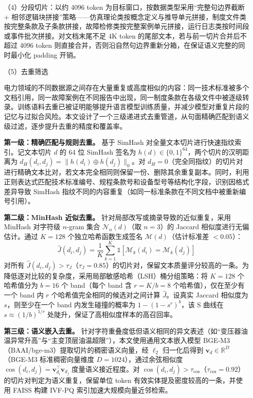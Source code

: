 \documentclass[fontset=fandol,type=master,campus=shenzhen,etitleauto=true]{hithesisbook}
\begin{document}
\noindent （4）分段切片：以约 4096 token 为目标窗口，按数据类型采用``完整句边界截断 + 相邻逻辑块拼接''策略——仿真理论类按概念定义与推导单元拼接，制度文件类按完整条款及子条款拼接，故障检修类按完整案例单元拼接，运行日志类按时间段或事件批次拼接。对文档末尾不足 4K token 的尾部文本，若与前一切片合并后不超过 4096 token 则直接合并，否则沿自然句边界重新分箱，在保证语义完整的同时最小化 padding 开销。

\noindent （5）去重筛选

电力领域的不同数据源之间存在大量重复或高度相似的内容：同一技术标准被多个文档引用，同一故障案例在不同报告中出现，同一制度条款在各级文件中被逐级转录。训练语料去重已被证明能够提升语言模型训练质量，并减少模型对重复片段的记忆与过拟合风险\cite{ref57}。本文设计了一个三级递进式去重管道，从句面精确匹配到语义级过滤，逐步提升去重的精度和覆盖率。

\textbf{第一级：精确匹配与规则去重。} 基于 SimHash 对全量文本切片进行快速指纹索引\cite{ref59,ref60}。记文本切片 $d$ 的 64 位 SimHash 签名为 $h(d) \in \{0,1\}^{64}$，两个切片的汉明距离为 $d_H(d_i, d_j) = \|h(d_i) \oplus h(d_j)\|_0$。对 $d_H = 0$（完全同指纹）的切片对进行精确文本比对，若文本完全相同则保留一份、删除其余重复副本。同时，利用正则表达式匹配技术标准编号、规程条款号和设备型号等结构化字段，识别因格式差异导致 SimHash 指纹不同的内容重复（如同一标准条款在不同文档中被重新编号引用）。

\textbf{第二级：MinHash 近似去重。} 针对局部改写或摘录导致的近似重复，采用 MinHash 对字符级 $n$-gram 集合 $\mathcal{N}_n(d)$（取 $n = 3$）的 Jaccard 相似度进行无偏估计\cite{ref61}。通过 $K = 128$ 个独立哈希函数生成签名 $\mathcal{M}(d)$（估计标准差 $< 0.05$）：
\begin{equation}
\hat{J}(d_i, d_j) = \frac{1}{K} \sum_{k=1}^{K} \mathbb{1}\left[\mathcal{M}_k(d_i) = \mathcal{M}_k(d_j)\right]
\end{equation}
对所有 $\hat{J}(d_i, d_j) > \tau_J$（$\tau_J = 0.85$）的切片对，保留文本质量评分较高的一条。为降低逐对比较的复杂度，采用局部敏感哈希（LSH）桶分组策略\cite{ref62}：将 $K=128$ 个哈希值分为 $b=16$ 个 band（每个 band 含 $r = K/b = 8$ 个哈希值），仅在至少有一个 band 内 $r$ 个哈希值完全相同的候选对之间计算 $\hat{J}$。设真实 Jaccard 相似度为 $s$，则至少在一个 band 内发生碰撞的概率为 $1 - (1 - s^r)^b$，该 S 曲线在 $s \approx (1/b)^{1/r}$ 处陡升，保证了高相似度样本的高召回率。

\textbf{第三级：语义嵌入去重。} 针对字符重叠度低但语义相同的异文表述（如``变压器油温异常升高''与``主变顶层油温超限''），本文使用通用文本嵌入模型 BGE-M3（BAAI/bge-m3）提取切片的稠密语义向量，经 $\ell_2$ 归一化后得到 $\mathbf{v}_d \in \mathbb{R}^{D}$（BGE-M3 标准稠密向量维度 $D = 1024$），通过余弦相似度 $\cos(d_i, d_j) = \mathbf{v}_{d_i}^{\top} \mathbf{v}_{d_j}$ 度量语义接近程度。对 $\cos(d_i, d_j) > \tau_{\cos}$（$\tau_{\cos} = 0.92$）的切片对判定为语义重复，保留单位 token 有效实体提及密度较高的一条，并使用 FAISS 构建 IVF-PQ 索引加速大规模向量近邻检索\cite{ref63}。
\end{document}
